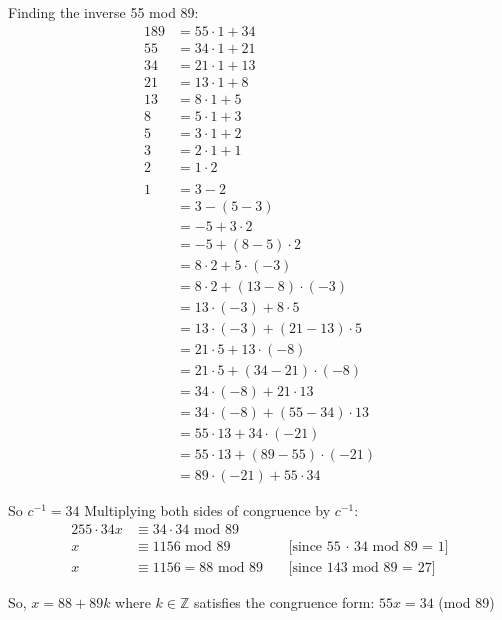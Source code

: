 \documentclass{article} %
\begin{document}
    Finding the inverse 55 mod 89:
    \begin{alignat*}{1}
        89 &= 55 \cdot 1 + 34\\
        55 &= 34 \cdot 1 + 21\\
        34 &= 21 \cdot 1 + 13\\
        21 &= 13 \cdot 1 + 8\\
        13 &= 8 \cdot 1 + 5\\
        8 &= 5 \cdot 1 + 3\\
        5 &= 3 \cdot 1 + 2\\
        3 &= 2 \cdot 1 + 1\\
        2 &= 1 \cdot 2\\
        \\
        1 &= 3 - 2\\
        &= 3 - (5 - 3)\\
        &= -5 + 3 \cdot 2\\
        &= -5 + (8 - 5) \cdot 2\\
        &= 8 \cdot 2 + 5 \cdot (-3)\\
        &= 8 \cdot 2 + (13 - 8) \cdot (-3)\\
        &= 13 \cdot (-3) + 8 \cdot 5\\
        &= 13 \cdot (-3) + (21 - 13) \cdot 5\\
        &= 21 \cdot 5 + 13 \cdot (-8)\\
        &= 21 \cdot 5 + (34 - 21) \cdot (-8)\\
        &= 34 \cdot (-8) + 21 \cdot 13\\
        &= 34 \cdot (-8) + (55 - 34) \cdot 13\\
        &= 55 \cdot 13 + 34 \cdot (-21)\\
        &= 55 \cdot 13 + (89 - 55) \cdot (-21)\\
        &= 89 \cdot (-21) + 55 \cdot 34
    \end{alignat*}

    So $c^{-1} = 34$
    Multiplying both sides of congruence by $c^{-1}$:
    \begin{alignat*}{2}
        55 \cdot 34x &\equiv 34 \cdot 34 \text{ mod } 89\ \\
        x &\equiv 1156 \text{ mod } 89 && \text{[since 55 $\cdot$ 34 mod 89 = 1]}\\
        x &\equiv 1156 = 88 \text{ mod } 89\ && \text{[since 143 mod 89 = 27]}
    \end{alignat*}

    So, $x = 88 + 89k$ where $k \in \mathbb{Z}$ satisfies the congruence form: $55x = 34$ (mod 89)
\end{document}
